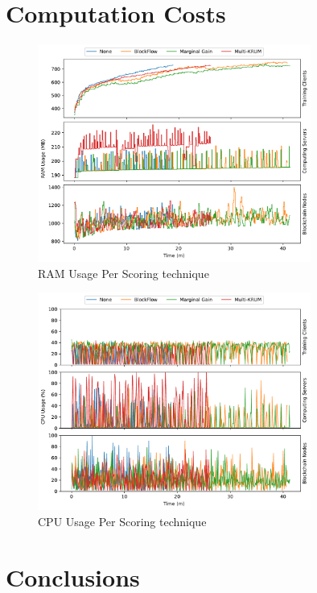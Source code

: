 \section{Computation Costs}

\begin{figure}[!hpt]
    \centering
    \centering
    \includegraphics[width=0.8\textwidth]{graphics/04_scoring_ram.pdf}
    \caption{RAM Usage Per Scoring technique}
    \label{fig:ram_scoring}
\end{figure}

\begin{figure}[!hpb]
    \centering
    \centering
    \includegraphics[width=0.8\textwidth]{graphics/04_scoring_cpu.pdf}
    \caption{CPU Usage Per Scoring technique}
    \label{fig:cpu_scoring}
\end{figure}

\section{Conclusions}

